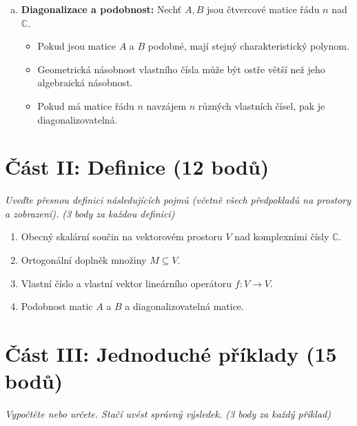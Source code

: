 \documentclass[a4paper,11pt]{article}
\begin{document}
\begin{enumerate}[(a)]
    \item \textbf{Diagonalizace a podobnost:} Nechť $A, B$ jsou čtvercové matice řádu $n$ nad $\mathbb{C}$.
    \begin{itemize}
        \item[\textbf{ANO / NE}] Pokud jsou matice $A$ a $B$ podobné, mají stejný charakteristický polynom.
        \item[\textbf{ANO / NE}] Geometrická násobnost vlastního čísla může být ostře větší než jeho algebraická násobnost.
        \item[\textbf{ANO / NE}] Pokud má matice řádu $n$ navzájem $n$ různých vlastních čísel, pak je diagonalizovatelná.
    \end{itemize}
\end{enumerate}

\vspace{0.5cm}

\section*{Část II: Definice (12 bodů)}
\textit{Uveďte přesnou definici následujících pojmů (včetně všech předpokladů na prostory a zobrazení). (3 body za každou definici)}

\begin{enumerate}
    \item Obecný skalární součin na vektorovém prostoru $V$ nad komplexními čísly $\mathbb{C}$.
    \item Ortogonální doplněk množiny $M \subseteq V$.
    \item Vlastní číslo a vlastní vektor lineárního operátoru $f: V \to V$.
    \item Podobnost matic $A$ a $B$ a diagonalizovatelná matice.
\end{enumerate}

\vspace{0.5cm}

\section*{Část III: Jednoduché příklady (15 bodů)}
\textit{Vypočtěte nebo určete. Stačí uvést správný výsledek. (3 body za každý příklad)}
\end{document}
